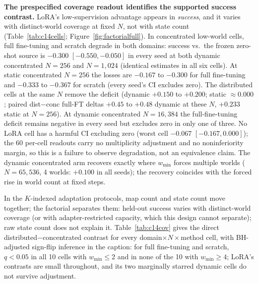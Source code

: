 \documentclass[letterpaper]{article} %
\begin{document}
\textbf{The prespecified coverage readout identifies the supported success contrast.} LoRA's low-supervision advantage appears in \emph{success}, and it varies with distinct-world coverage at fixed $N$, not with state count (Table~\ref{tab:c14cells}; Figure~\ref{fig:factorialfull}). In concentrated low-world cells, full fine-tuning and scratch degrade in both domains: success vs.\ the frozen zero-shot source is $-0.300$ $[-0.550,-0.050]$ in every seed at both dynamic concentrated $N{=}256$ and $N{=}1{,}024$ (identical estimates in all six cells). At static concentrated $N{=}256$ the losses are $-0.167$ to $-0.300$ for full fine-tuning and $-0.333$ to $-0.367$ for scratch (every seed's CI excludes zero). The distributed cells at the same $N$ remove the deficit (dynamic $+0.150$ to $+0.200$; static $\approx 0.000$; paired dist$-$conc full-FT deltas $+0.45$ to $+0.48$ dynamic at these $N$, $+0.233$ static at $N{=}256$). At dynamic concentrated $N{=}16{,}384$ the full-fine-tuning deficit remains negative in every seed but excludes zero in only one of three. No LoRA cell has a harmful CI excluding zero (worst cell $-0.067$ $[-0.167, 0.000]$); the 60 per-cell readouts carry no multiplicity adjustment and no noninferiority margin, so this is a failure to observe degradation, not an equivalence claim. The dynamic concentrated arm recovers exactly where $w_{\min}$ forces multiple worlds ($N{=}65{,}536$, 4 worlds: $+0.100$ in all seeds); the recovery coincides with the forced rise in world count at fixed steps.

In the $K$-indexed adaptation protocols, map count and state count move together; the factorial separates them: held-out success varies with distinct-world coverage (or with adapter-restricted capacity, which this design cannot separate); raw state count does not explain it. Table~\ref{tab:c14cov} gives the direct distributed$-$concentrated contrast for every domain$\times N\times$method cell, with BH-adjusted sign-flip inference in the caption: for full fine-tuning and scratch, $q{<}0.05$ in all 10 cells with $w_{\min} \leq 2$ and in none of the 10 with $w_{\min} \geq 4$; LoRA's contrasts are small throughout, and its two marginally starred dynamic cells do not survive adjustment.
\end{document}
